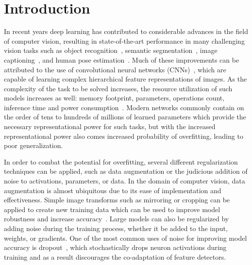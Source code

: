 \documentclass[10pt,twocolumn,letterpaper]{article}
\begin{document}
\vspace{-0.4cm} %
\section{Introduction}
In recent years deep learning has contributed to considerable advances in the field of computer vision, resulting in state-of-the-art performance in many challenging vision tasks such as object recognition~\cite{krizhevsky2012imagenet}, semantic segmentation~\cite{long2015fully}, image captioning~\cite{vinyals2015show}, and human pose estimation~\cite{toshev2014deeppose}. Much of these improvements can be attributed to the use of convolutional neural networks (CNNs)~\cite{lecun1998gradient}, which are capable of learning complex hierarchical feature representations of images. As the complexity of the task to be solved increases, the resource utilization of such models increases as well: memory footprint, parameters, operations count, inference time and power consumption~\cite{Canziani2016-si}.
Modern networks commonly contain on the order of tens to hundreds of millions of learned parameters which provide the necessary representational power for such tasks, but with the increased representational power also comes increased probability of overfitting, leading to poor generalization.

In order to combat the potential for overfitting, several different regularization techniques can be applied, such as data augmentation or the judicious addition of noise to activations, parameters, or data. In the domain of computer vision, data augmentation is almost ubiquitous due to its ease of implementation and effectiveness. Simple image transforms such as mirroring or cropping can be applied to create new training data which can be used to improve model robustness and increase accuracy~\cite{lecun1998gradient}. Large models can also be regularized by adding noise during the training process, whether it be added to the input, weights, or gradients. One of the most common uses of noise for improving model accuracy is dropout~\cite{hinton2012improving}, which stochastically drops neuron activations during training and as a result discourages the co-adaptation of feature detectors.
\end{document}
